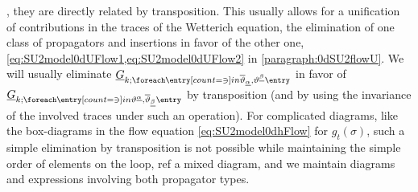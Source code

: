 \ie{}, they are directly related by transposition.
This usually allows for a unification of \gmv{} contributions in the traces of the Wetterich equation, \viz{} the elimination of one class of propagators and insertions in favor of the other one, \cf{} \cref{eq:SU2model0dUFlow1,eq:SU2model0dUFlow2} in \cref{paragraph:0dSU2flowU}.
We will usually eliminate $\FSpropagatorArg{\FSGEoM}{\overline{\vartheta} {}_{\underline{\alpha}},{\vartheta} \text{}^{\underline{\beta}}}$ in favor of $\FSpropagatorArg{\FSGEoM}{{\vartheta} \text{}^{\underline{\alpha}},\overline{\vartheta} {}_{\underline{\beta}}}$ by transposition (and by using the invariance of the involved traces under such an operation).
For complicated diagrams, like the box-diagrams in the flow equation \eqref{eq:SU2model0dhFlow} for $g_t(\sigma)$, such a simple elimination by transposition is not possible while maintaining the simple order of elements on the loop, \cf{} ref a mixed diagram, and we maintain diagrams and expressions involving both propagator types.

